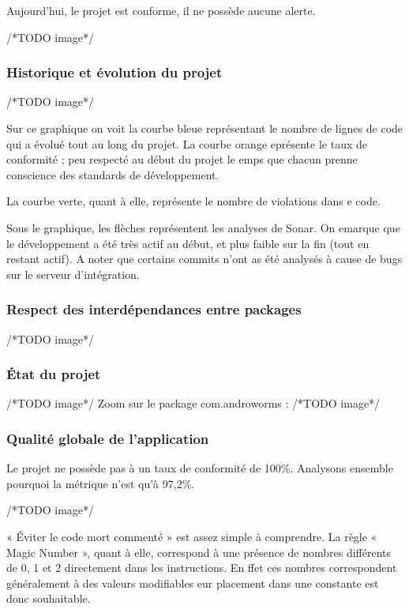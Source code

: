 \documentclass{report}
\begin{document}
Aujourd’hui, le projet est conforme, il ne possède aucune alerte.

/*TODO image*/

\subsubsection{Historique et évolution du projet}

/*TODO image*/

Sur ce graphique on voit la courbe bleue représentant le nombre de
lignes de code qui a évolué tout au long du projet. La courbe orange
eprésente le taux de conformité ; peu respecté au début du projet le
emps que chacun prenne conscience des standards de développement. 

La courbe verte, quant à elle, représente le nombre de violations dans
e code.

Sous le graphique, les flèches représentent les analyses de Sonar. On
emarque que le développement a été très actif au début, et plus faible
sur la fin (tout en restant actif). A noter que certains commits n’ont
as été analysés à cause de bugs sur le serveur d’intégration.

\subsubsection{Respect des interdépendances entre packages}

/*TODO image*/

\subsubsection{État du projet}
/*TODO image*/
Zoom sur le package com.androworms :
/*TODO image*/

\subsubsection{Qualité globale de l’application}

Le projet ne possède pas à un taux de conformité de 100\%. Analysons
ensemble pourquoi la  métrique n’est qu’à 97,2\%.

/*TODO image*/

« Éviter le code mort commenté » est assez simple à comprendre. La
règle « Magic Number », quant à elle, correspond à une présence de
nombres différents de 0, 1 et 2 directement dans les instructions. En
ffet ces nombres correspondent généralement à des valeurs modifiables
eur placement dans une constante est donc souhaitable.
\end{document}
